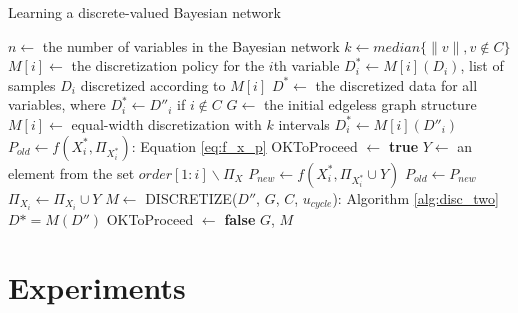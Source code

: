 \begin{algorithm}
  \label{alg:structure_learn}
  \caption{ Learning a discrete-valued Bayesian network}
  \begin{algorithmic}[5]
    \State $n \leftarrow$ the number of variables in the Bayesian network
    \State $k \leftarrow median\{ \|v\|, v\notin C\}$
    \State $M[i] \leftarrow$ the discretization policy for the $i$th variable
    \State $D^*_i \leftarrow M[i] (D_i)$, list of samples $D_i$ discretized according to $M[i]$
    \State $D^* \leftarrow $ the discretized data for all variables, where $D^*_i \leftarrow D''_i$ if $i \notin C$
    \State $G \leftarrow$ the initial edgeless graph structure
        \State $M[i] \leftarrow$  equal-width discretization with $k$ intervals
        \State $D^*_i \leftarrow  M[i] (D''_i)$
      \EndIf
    \EndFor
      \State $P_{old} \leftarrow f(X^*_i,\Pi_{X^*_i})$: Equation \ref{eq:f_x_p}
      \State OKToProceed $\leftarrow$ \textbf{true}
        \State $Y \leftarrow$ an element from the set $order[1:i] \backslash \Pi_X$
        \State $P_{new} \leftarrow f(X^*_i,\Pi_{X^*_i} \cup Y)$
          \State $P_{old} \leftarrow P_{new}$
          \State $\Pi_{X_i} \leftarrow \Pi_{X_i} \cup Y $
          \State $M \leftarrow$ {DISCRETIZE}({$D''$, $G$, $C$, $u_{cycle}$}): Algorithm \ref{alg:disc_two}
          \State $D* = M(D'')$
        \Else
          \State OKToProceed $\leftarrow$ \textbf{false}
        \EndIf
      \EndWhile
    \EndFor
    \State \Return $G$, $M$
  \EndFunction
  \end{algorithmic}
\end{algorithm}


\section{Experiments}
\label{sec:experiments}




